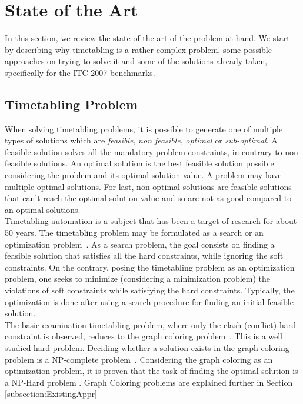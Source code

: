 \chapter{State of the Art}
\label{stateofart}
\thispagestyle{plain}

In this section, we review the state of the art of the problem at hand. We start by describing why timetabling is a rather complex problem, some possible approaches on trying to solve it and some of the solutions already taken, specifically for the ITC 2007 benchmarks.\\

\section{Timetabling Problem}

When solving timetabling problems, it is possible to generate one of multiple types of solutions which are \textit{feasible}, \textit{non feasible}, \textit{optimal} or \textit{sub-optimal}. A feasible solution solves all the mandatory problem constraints, in contrary to non feasible solutions. An optimal solution is the best feasible solution possible considering the problem and its optimal solution value. A problem may have multiple optimal solutions. For last, non-optimal solutions are feasible solutions that can't reach the optimal solution value and so are not as good compared to an optimal solutions.\\

Timetabling automation is a subject that has been a target of research for about 50 years. The timetabling problem may be formulated as a search or an optimization problem~\cite{Schaerf1999}. As a search problem, the goal consists on finding a feasible solution that satisfies all the hard constraints, while ignoring the soft constraints. On the contrary, posing the timetabling problem as an optimization problem, one seeks to minimize (considering a minimization problem) the violations of soft constraints while satisfying the hard constraints. Typically, the optimization is done after using a search procedure for finding an initial feasible solution.\\

The basic examination timetabling problem, where only the clash (conflict) hard constraint is observed, reduces to the graph coloring problem~\cite{Jensen2001}. This is a well studied hard problem. Deciding whether a solution exists in the graph coloring problem is a NP-complete problem~\cite{Arora2009}. Considering the graph coloring as an optimization problem, it is proven that the task of finding the optimal solution is a NP-Hard problem \cite{Arora2009}. Graph Coloring problems are explained further in Section \ref{subsection:ExistingAppr}
\\
